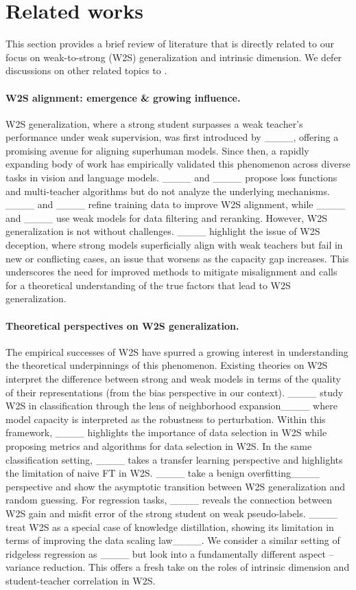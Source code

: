 \section{Related works}
This section provides a brief review of literature that is directly related to our focus on weak-to-strong (W2S) generalization and intrinsic dimension. We defer discussions on other related topics to .

\paragraph{W2S alignment: emergence \& growing influence.}
W2S generalization, where a strong student surpasses a weak teacher's performance under weak supervision, was first introduced by ____, offering a promising avenue for aligning superhuman models. Since then, a rapidly expanding body of work has empirically validated this phenomenon across diverse tasks in vision and language models. ____ and ____ propose loss functions and multi-teacher algorithms but do not analyze the underlying mechanisms. ____ and ____ refine training data to improve W2S alignment, while ____ and ____ use weak models for data filtering and reranking.
However, W2S generalization is not without challenges. ____ highlight the issue of W2S deception, where strong models superficially align with weak teachers but fail in new or conflicting cases, an issue that worsens as the capacity gap increases. This underscores the need for improved methods to mitigate misalignment and calls for a theoretical understanding of the true factors that lead to W2S generalization.

\paragraph{Theoretical perspectives on W2S generalization.} 
The empirical successes of W2S have spurred a growing interest in understanding the theoretical underpinnings of this phenomenon. Existing theories on W2S interpret the difference between strong and weak models in terms of the quality of their representations (from the bias perspective in our context). 
____ study W2S in classification through the lens of neighborhood expansion____ where model capacity is interpreted as the robustness to perturbation.
Within this framework, ____ highlights the importance of data selection in W2S while proposing metrics and algorithms for data selection in W2S.
In the same classification setting, ____ takes a transfer learning perspective and highlights the limitation of naive FT in W2S.
____ take a benign overfitting____ perspective and show the asymptotic transition between W2S generalization and random guessing.
For regression tasks, ____ reveals the connection between W2S gain and misfit error of the strong student on weak pseudo-labels.
____ treat W2S as a special case of knowledge distillation, showing its limitation in terms of improving the data scaling law____.
We consider a similar setting of ridgeless regression as ____ but look into a fundamentally different aspect -- variance reduction. This offers a fresh take on the roles of intrinsic dimension and student-teacher correlation in W2S. 

